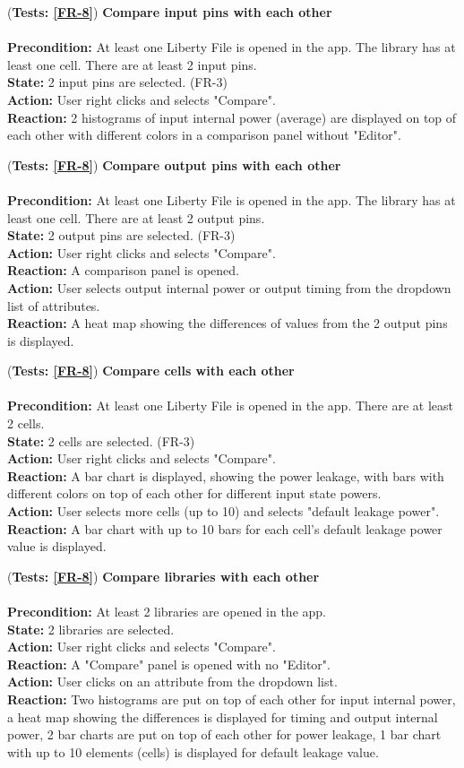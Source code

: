 \documentclass[10pt,a4paper]{report}
\newcommand{\precondition}[1]{
    \textbf{Precondition: } #1 \leavevmode \\
}
\newcommand{\action}[1]{
    \textbf{Action: } #1 \leavevmode \\
}
\newcommand{\state}[1]{
    \textbf{State: } #1 \leavevmode \\
}
\newcommand{\reaction}[1]{
    \textbf{Reaction: } #1 \leavevmode \\
}
\newcommand{\GTCDescription}[2]{
    (\textbf{Tests: #1}) \textbf{#2} \leavevmode \\
}
\begin{document}
\begin{GTC}
    \item \GTCDescription{\ref{FR-8}}
    {Compare input pins with each other} \leavevmode \\ 
        \precondition{At least one Liberty File is opened in the app. The library has at least one cell. There are at least 2 input pins.}
        \state{2 input pins are selected. (FR-3)}
        \action{User right clicks and selects "Compare".}
        \reaction{2 histograms of input internal power (average) are displayed on top of each other with different colors in a comparison panel without "Editor".}\label{GTC-23}
    
    \item \GTCDescription{\ref{FR-8}}
    {Compare output pins with each other} \leavevmode \\ 
        \precondition{At least one Liberty File is opened in the app. The library has at least one cell. There are at least 2 output pins.}
        \state{2 output pins are selected. (FR-3)}
        \action{User right clicks and selects "Compare".}
        \reaction{A comparison panel is opened.}
        \action{User selects output internal power or output timing from the dropdown list of attributes.}
        \reaction{A heat map showing the differences of values from the 2 output pins is displayed.}\label{GTC-24}
    
    \item \GTCDescription{\ref{FR-8}}
    {Compare cells with each other} \leavevmode \\ 
        \precondition{At least one Liberty File is opened in the app. There are at least 2 cells.}
        \state{2 cells are selected. (FR-3)}
        \action{User right clicks and selects "Compare".}
        \reaction{A bar chart is displayed, showing the power leakage, with bars with different colors on top of each other for different input state powers.}
        \action{User selects more cells (up to 10) and selects "default leakage power".}
        \reaction{A bar chart with up to 10 bars for each cell's default leakage power value is displayed.}\label{GTC-25}
    
    \item \GTCDescription{\ref{FR-8}}
    {Compare libraries with each other} \leavevmode \\ 
        \precondition{At least 2 libraries are opened in the app.}
        \state{2 libraries are selected.}
        \action{User right clicks and selects "Compare".}
        \reaction{ A "Compare" panel is opened with no "Editor".}
        \action{User clicks on an attribute from the dropdown list.}
        \reaction{Two histograms are put on top of each other for input internal power, a heat map  showing the differences is displayed for timing and output internal power, 2 bar   charts are put on top of each other for power leakage, 1 bar chart with up to 10 elements (cells) is displayed for default leakage value.}\label{GTC-26}
    

\end{GTC}
\end{document}
